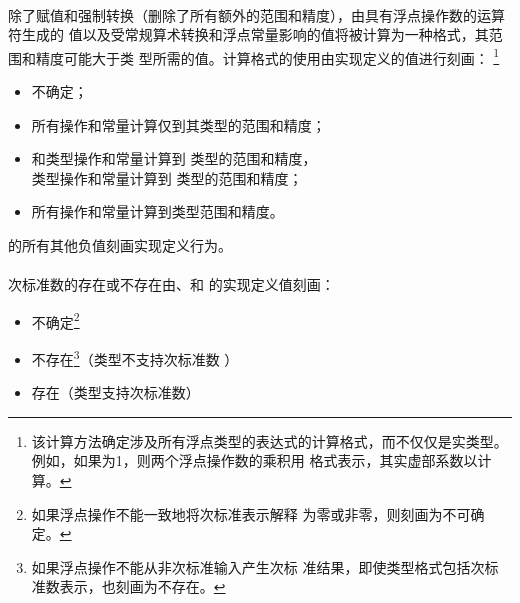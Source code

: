 \paragraph{}
除了赋值和强制转换（删除了所有额外的范围和精度），由具有浮点操作数的运算符生成的
值以及受常规算术转换和浮点常量影响的值将被计算为一种格式，其范围和精度可能大于类
型所需的值。计算格式的使用由实现定义的值进行刻画：
\footnote{该计算方法确定涉及所有浮点类型的表达式的计算格式，而不仅仅是实类型。
例如，如果为1，则两个浮点操作数的乘积用
格式表示，其实虚部系数以计算。}
\begin{itemize}
  \item[]{  \qquad 不确定；}
  \item[]{ \qquad 所有操作和常量计算仅到其类型的范围和精度；}
  \item[]{ \qquad {}和类型操作和常量计算到
    类型的范围和精度，\\
           \qquad {}类型操作和常量计算到
    类型的范围和精度；}
  \item[]{ \qquad 所有操作和常量计算到类型范围和精度。}
\end{itemize}
的所有其他负值刻画实现定义行为。

\paragraph{}
次标准数的存在或不存在由、和
的实现定义值刻画：
\begin{itemize}
  \item[]{  \qquad 不确定\footnote{如果浮点操作不能一致地将次标准表示解释
    为零或非零，则刻画为不可确定。}}
  \item[]{ \qquad 不存在\footnote{如果浮点操作不能从非次标准输入产生次标
    准结果，即使类型格式包括次标准数表示，也刻画为不存在。}（类型不支持次标准数
    ）}
  \item[]{ \qquad 存在（类型支持次标准数）}
\end{itemize}

